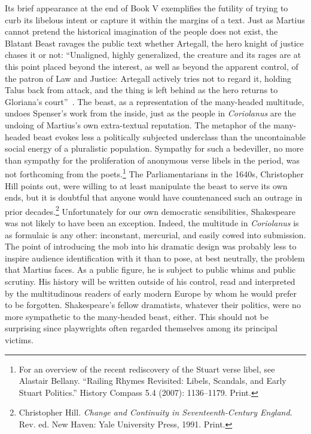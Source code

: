 Its brief appearance at the end of Book V exemplifies the futility of trying to curb its libelous intent or capture it within the margins of a text.
Just as Martius cannot pretend the historical imagination of the people does not exist, the Blatant Beast ravages the public text whether Artegall, the hero knight of justice chases it or not: ``Unaligned, highly generalized, the creature and its rages are at this point placed beyond the interest, as well as beyond the apparent control, of the patron of Law and Justice: Artegall actively tries not to regard it, holding Talus back from attack, and the thing is left behind as the hero returns to Gloriana's court''~\cite[105]{gross_reflections_1999}.
The beast, as a representation of the many-headed multitude, undoes Spenser's work from the inside, just as the people in \emph{Coriolanus} are the undoing of Martius's own extra-textual reputation.
The metaphor of the many-headed beast evokes less a politically subjected underclass than the uncontainable social energy of a pluralistic population.
Sympathy for such a bedeviller, no more than sympathy for the proliferation of anonymous verse libels in the period, was not forthcoming from the poets.\footnote{For an overview of the recent rediscovery of the Stuart verse libel, see Alastair Bellany. ``Railing Rhymes Revisited: Libels, Scandals, and Early Stuart Politics.'' History Compass 5.4 (2007): 1136–1179. Print. \nocite{bellany_railing_2007}} 
The Parliamentarians in the 1640s, Christopher Hill points out, were willing to at least manipulate the beast to serve its own ends, but it is doubtful that anyone would have countenanced such an outrage in prior decades.\footnote{Christopher Hill. \emph{Change and Continuity in Seventeenth-Century England}. Rev. ed. New Haven: Yale University Press, 1991. Print. \nocite{hill_change_1991}} 
Unfortunately for our own democratic sensibilities, Shakespeare was not likely to have been an exception.
Indeed, the multitude in \emph{Coriolanus} is as formulaic is any other: inconstant, mercurial, and easily cowed into submission.
The point of introducing the mob into his dramatic design was probably less to inspire audience identification with it than to pose, at best neutrally, the problem that Martius faces.
As a public figure, he is subject to public whims and public scrutiny.
His history will be written outside of his control, read and interpreted by the multitudinous readers of early modern Europe by whom he would prefer to be forgotten.
Shakespeare's fellow dramatists, whatever their politics, were no more sympathetic to the many-headed beast, either.
This should not be surprising since playwrights often regarded themselves among its principal victims.

